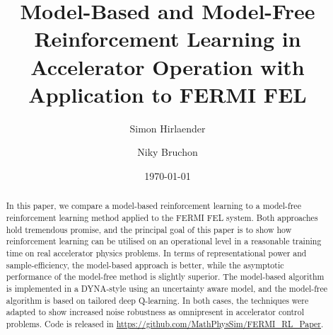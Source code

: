\documentclass[
reprint,
amsmath,amssymb,amsfonts,clevref,
aps,
prstab,
]{revtex4-2}
\begin{document}
	
	
	
	
	\title{Model-Based and Model-Free Reinforcement Learning in Accelerator Operation with Application to FERMI FEL}
	
	
	
	\author{Simon Hirlaender}
	\author{Niky Bruchon}%
	
	\date{\today}%
	
	
	\begin{abstract}
		In this paper, we compare a model-based reinforcement learning to a model-free reinforcement learning method applied to the FERMI FEL system. Both approaches hold tremendous promise, and the principal goal of this paper is to show how reinforcement learning can be utilised on an operational level in a reasonable training time on real accelerator physics problems. In terms of representational power and sample-efficiency, the model-based approach is better, while the asymptotic performance of the model-free method is slightly superior. The model-based algorithm is implemented in a DYNA-style using an uncertainty aware model, and the model-free algorithm is based on tailored deep Q-learning. In both cases, the techniques were adapted to show increased noise robustness as omnipresent in accelerator control problems. Code is released in \url{https://github.com/MathPhysSim/FERMI_RL_Paper}.
		
	\end{abstract}
	\maketitle

\end{document}
